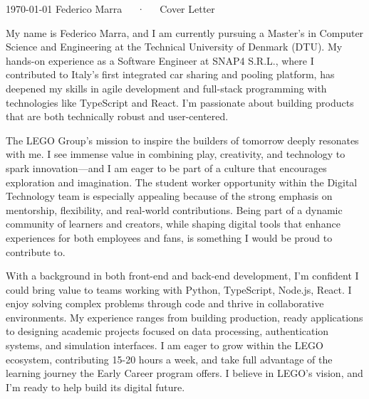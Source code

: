 \documentclass[11pt, a4paper]{awesome-cv}
\begin{document}
\makecvheader[R]

\makecvfooter
  {\today}
  {Federico Marra~~~·~~~Cover Letter}
  {}

\makelettertitle

\begin{cvletter}

My name is Federico Marra, and I am currently pursuing a Master’s in Computer Science and Engineering at the Technical University of Denmark (DTU). My hands-on experience as a Software Engineer at SNAP4 S.R.L., where I contributed to Italy’s first integrated car sharing and pooling platform, has deepened my skills in agile development and full-stack programming with technologies like TypeScript and React. I’m passionate about building products that are both technically robust and user-centered.

The LEGO Group’s mission to inspire the builders of tomorrow deeply resonates with me. I see immense value in combining play, creativity, and technology to spark innovation—and I am eager to be part of a culture that encourages exploration and imagination. The student worker opportunity within the Digital Technology team is especially appealing because of the strong emphasis on mentorship, flexibility, and real-world contributions. Being part of a dynamic community of learners and creators, while shaping digital tools that enhance experiences for both employees and fans, is something I would be proud to contribute to.

With a background in both front-end and back-end development, I’m confident I could bring value to teams working with Python, TypeScript, Node.js, React. I enjoy solving complex problems through code and thrive in collaborative environments. My experience ranges from building production, ready applications to designing academic projects focused on data processing, authentication systems, and simulation interfaces. I am eager to grow within the LEGO ecosystem, contributing 15-20 hours a week, and take full advantage of the learning journey the Early Career program offers. I believe in LEGO's vision, and I’m ready to help build its digital future.

\end{cvletter}

\makeletterclosing
\end{document}

